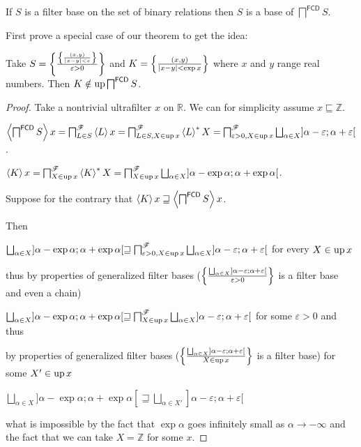 \begin{thm}
  If $S$ is a filter base on the set of binary relations then $S$ is a base of
  $\bigsqcap^{\mathsf{FCD}} S$.
\end{thm}

First prove a special case of our theorem to get the idea:

\begin{example}
  Take $S = \left\{ \frac{
  \left\{ \frac{ (x, y) }{ | x - y | < \varepsilon }\right\}}{ \varepsilon > 0 }\right\}$ and $K = \left\{ \frac{ (x, y) }{
  | x - y | < \exp x }\right\}$ where $x$ and $y$ range real
  numbers. Then $K \notin \operatorname{up} \bigsqcap^{\mathsf{FCD}} S$.
\end{example}

\begin{proof}
  Take a nontrivial ultrafilter $x$ on $\mathbb{R}$. We can for simplicity
  assume $x \sqsubseteq \mathbb{Z}$.
  
  $\supfun{\bigsqcap^{\mathsf{FCD}} S} x =
  \bigsqcap^{\mathscr{F}}_{L \in S} \supfun{L} x =
  \bigsqcap^{\mathscr{F}}_{L \in S, X \in \up x} \rsupfun{L} X =
  \bigsqcap^{\mathscr{F}}_{\varepsilon > 0, X \in \up
  x} \bigsqcup_{\alpha \in X}] \alpha - \varepsilon ; \alpha + \varepsilon [$.
  
  $\supfun{K} x = \bigsqcap^{\mathscr{F}}_{X \in \up x} \rsupfun{K} X =
  \bigsqcap^{\mathscr{F}}_{X \in \up x}
  \bigsqcup_{\alpha \in X}] \alpha - \exp \alpha ; \alpha + \exp \alpha [$.
  
  Suppose for the contrary that $\left\langle K\right\rangle x \sqsupseteq \left\langle 
  \bigsqcap^{\mathsf{FCD}} S \right\rangle x$.
  
  Then
  
  $\bigsqcup_{\alpha \in X}] \alpha - \exp \alpha ; \alpha + \exp \alpha
  [\sqsupseteq \bigsqcap^{\mathscr{F}}_{\varepsilon > 0, X \in \up x}
  \bigsqcup_{\alpha \in X}] \alpha - \varepsilon ; \alpha + \varepsilon [$ for
  every $X \in \operatorname{up} x$
  
  thus by properties of generalized filter bases ($\setcond{ \bigsqcup_{\alpha
  \in X}] \alpha - \varepsilon ; \alpha + \varepsilon [ }{
  \varepsilon > 0 }$ is a filter base and even a chain)
  
  $\bigsqcup_{\alpha \in X}] \alpha - \exp \alpha ; \alpha + \exp \alpha
  [\sqsupseteq \bigsqcap^{\mathscr{F}}_{X \in \up x} \bigsqcup_{\alpha
  \in X}] \alpha - \varepsilon ; \alpha + \varepsilon [$ for some $\varepsilon
  > 0$ and thus
  
  by properties of generalized filter bases ($\setcond{ \bigsqcup_{\alpha \in
  X}] \alpha - \varepsilon ; \alpha + \varepsilon [ }{
  X \in \up x }$ is a filter base) for some $X' \in \operatorname{up} x$
  
  $\bigsqcup_{\alpha \in X}] \alpha - \exp \alpha ; \alpha + \exp \alpha
  [\sqsupseteq \bigsqcup_{\alpha \in X'}] \alpha - \varepsilon ; \alpha +
  \varepsilon [$
  
  what is impossible by the fact that $\exp \alpha$ goes infinitely small as
  $\alpha \rightarrow - \infty$ and the fact that we can take $X =\mathbb{Z}$
  for some $x$.
\end{proof}

